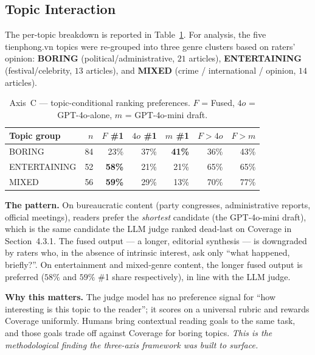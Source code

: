 \subsection{Topic Interaction}

The per-topic breakdown is reported in Table~\ref{tab:axisC-topic}.
For analysis, the five tienphong.vn topics were re-grouped into three
genre clusters based on raters' opinion: \textbf{BORING} (political/administrative,
$21$ articles), \textbf{ENTERTAINING} (festival/celebrity,
$13$ articles), and \textbf{MIXED} (crime / international / opinion,
$14$ articles).

\begin{table}[H]
  \centering
  \caption{Axis~C --- topic-conditional ranking preferences.
  $F$ = Fused, $4o$ = GPT-4o-alone, $m$ = GPT-4o-mini draft.}
  \label{tab:axisC-topic}
  \begin{tabular}{lrrrrrr}
    \toprule
    Topic group & $n$ & $F$ \#1 & $4o$ \#1 & $m$ \#1 & $F > 4o$ & $F > m$ \\
    \midrule
    BORING         & 84 & 23\% & 37\% & \textbf{41\%} & 36\% & 43\% \\
    ENTERTAINING   & 52 & \textbf{58\%} & 21\% & 21\% & 65\% & 65\% \\
    MIXED          & 56 & \textbf{59\%} & 29\% & 13\% & 70\% & 77\% \\
    \bottomrule
  \end{tabular}
\end{table}

\textbf{The pattern.} On bureaucratic content (party congresses,
administrative reports, official meetings), readers prefer the
\textit{shortest} candidate (the GPT-4o-mini draft), which is the same
candidate the LLM judge ranked dead-last on Coverage in
Section~4.3.1. The fused output --- a longer, editorial synthesis ---
is downgraded by raters who, in the absence of intrinsic interest,
ask only ``what happened, briefly?''. On entertainment and
mixed-genre content, the longer fused output is preferred
($58\%$ and $59\%$ \#1 share respectively), in line with the LLM
judge.

\textbf{Why this matters.} The judge model has no preference signal
for ``how interesting is this topic to the reader''; it scores on a
universal rubric and rewards Coverage uniformly. Humans bring
contextual reading goals to the same task, and those goals trade off
against Coverage for boring topics. \textit{This is the
methodological finding the three-axis framework was built to
surface.}

